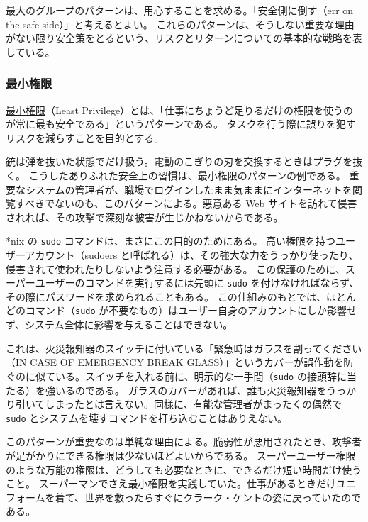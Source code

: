 \documentclass[uplatex]{jsarticle}
\def\label#1{}%
\begin{document}
最大のグループのパターンは、用心することを求める。「安全側に倒す（err on the safe side）」と考えるとよい。
これらのパターンは、そうしない重要な理由がない限り安全策をとるという、リスクとリターンについての基本的な戦略を表している。

\subsubsection{最小権限}

\begin{dfn}[最小権限]\label{dfn:ch4-least-privilege}
\underline{最小権限}（Least Privilege）とは、「仕事にちょうど足りるだけの権限を使うのが常に最も安全である」というパターンである。
タスクを行う際に誤りを犯すリスクを減らすことを目的とする。
\end{dfn}

銃は弾を抜いた状態でだけ扱う。電動のこぎりの刃を交換するときはプラグを抜く。
こうしたありふれた安全上の習慣は、最小権限のパターンの例である。
重要なシステムの管理者が、職場でログインしたまま気ままにインターネットを閲覧すべきでないのも、このパターンによる。悪意ある Web サイトを訪れて侵害されれば、その攻撃で深刻な被害が生じかねないからである。

\begin{exa}\label{exa:ch4-sudo}
*nix の \texttt{sudo} コマンドは、まさにこの目的のためにある。
高い権限を持つユーザーアカウント（\underline{sudoers} と呼ばれる）は、その強大な力をうっかり使ったり、侵害されて使われたりしないよう注意する必要がある。
この保護のために、スーパーユーザーのコマンドを実行するには先頭に \texttt{sudo} を付けなければならず、その際にパスワードを求められることもある。
この仕組みのもとでは、ほとんどのコマンド（\texttt{sudo} が不要なもの）はユーザー自身のアカウントにしか影響せず、システム全体に影響を与えることはできない。

これは、火災報知器のスイッチに付いている「緊急時はガラスを割ってください（IN CASE OF EMERGENCY BREAK GLASS）」というカバーが誤作動を防ぐのに似ている。スイッチを入れる前に、明示的な一手間（\texttt{sudo} の接頭辞に当たる）を強いるのである。
ガラスのカバーがあれば、誰も火災報知器をうっかり引いてしまったとは言えない。同様に、有能な管理者がまったくの偶然で \texttt{sudo} とシステムを壊すコマンドを打ち込むことはありえない。
\end{exa}

このパターンが重要なのは単純な理由による。脆弱性が悪用されたとき、攻撃者が足がかりにできる権限は少ないほどよいからである。
スーパーユーザー権限のような万能の権限は、どうしても必要なときに、できるだけ短い時間だけ使うこと。
スーパーマンでさえ最小権限を実践していた。仕事があるときだけユニフォームを着て、世界を救ったらすぐにクラーク・ケントの姿に戻っていたのである。
\end{document}

